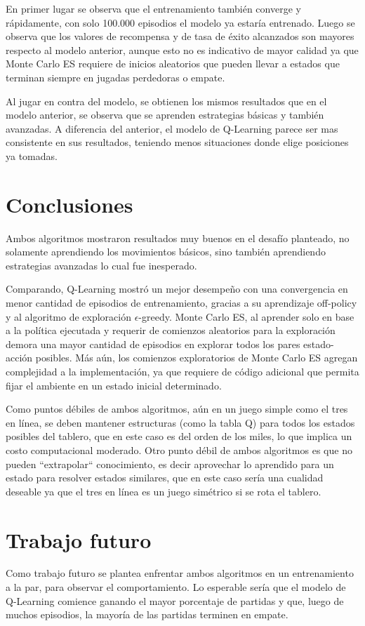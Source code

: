 En primer lugar se observa que el entrenamiento también converge y rápidamente, con solo 100.000 episodios el modelo ya estaría entrenado. Luego se observa que los valores de recompensa y de tasa de éxito alcanzados son mayores respecto al modelo anterior, aunque esto no es indicativo de mayor calidad ya que Monte Carlo ES requiere de inicios aleatorios que pueden llevar a estados que terminan siempre en jugadas perdedoras o empate.

Al jugar en contra del modelo, se obtienen los mismos resultados que en el modelo anterior, se observa que se aprenden estrategias básicas y también avanzadas. A diferencia del anterior, el modelo de Q-Learning parece ser mas consistente en sus resultados, teniendo menos situaciones donde elige posiciones ya tomadas.

\section{Conclusiones}

Ambos algoritmos mostraron resultados muy buenos en el desafío planteado, no solamente aprendiendo los movimientos básicos, sino también aprendiendo estrategias avanzadas lo cual fue inesperado. 

Comparando, Q-Learning mostró un mejor desempeño con una convergencia en menor cantidad de episodios de entrenamiento, gracias a su aprendizaje off-policy y al algoritmo de exploración \(\epsilon\)-greedy. Monte Carlo ES, al aprender solo en base a la política ejecutada y requerir de comienzos aleatorios para la exploración demora una mayor cantidad de episodios en explorar todos los pares estado-acción posibles. Más aún, los comienzos exploratorios de Monte Carlo ES agregan complejidad a la implementación, ya que requiere de código adicional que permita fijar el ambiente en un estado inicial determinado. 

Como puntos débiles de ambos algoritmos, aún en un juego simple como el tres en línea, se deben mantener estructuras (como la tabla Q) para todos los estados posibles del tablero, que en este caso es del orden de los miles, lo que implica un costo computacional moderado. Otro punto débil de ambos algoritmos es que no pueden ``extrapolar`` conocimiento, es decir aprovechar lo aprendido para un estado para resolver estados similares, que en este caso sería una cualidad deseable ya que el tres en línea es un juego simétrico si se rota el tablero.

\section{Trabajo futuro}

Como trabajo futuro se plantea enfrentar ambos algoritmos en un entrenamiento a la par, para observar el comportamiento. Lo esperable sería que el modelo de Q-Learning comience ganando el mayor porcentaje de partidas y que, luego de muchos episodios, la mayoría de las partidas terminen en empate.

